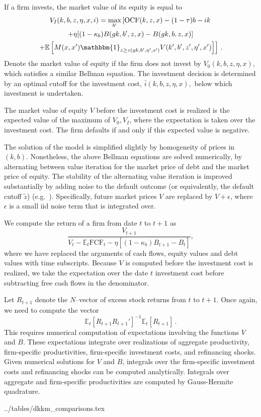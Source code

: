 \documentclass[12pt]{scrarticle}
\begin{document}
\begin{appendices}
If a firm invests, the market value of its equity is equal to 
\begin{multline*}
V_I(k, b, z, \eta, x, i) = \max_{b'}\left[\text{OCF}(k, z, x) - (1 - \tau) b - ik\right.\\
\left.+ \eta[(1 - \kappa_b) B(gk, b', z, x) - B(gk, b, z, x)] \right.\\
\left.+  \mathbb{E}\left[ M(x, x') \mathbbm{1}_{z \geq z(gk, b', \eta', s')} V(k', b', z', \eta', x')\right]\right]\, .
\end{multline*}
Denote the market value of equity if the firm does not invest by $V_0(k, b, z, \eta, x),$ which satisfies a similar Bellman equation. The investment decision is determined by an optimal cutoff for the investment cost, $\bar i(k, b, z, \eta, x),$ below which investment is undertaken. 

The market value of equity $V$ before the investment cost is realized is the expected value of the maximum of $V_0, V_I$, where the expectation is taken over the investment cost. The firm defaults if and only if this expected value is negative. 

The solution of the model is simplified slightly by homogeneity of prices in $(k, b).$ Nonetheless, the above Bellman equations are solved numerically, by alternating between value iteration for the market price of debt and the market price of equity. The stability of the alternating value iteration is improved substantially by adding noise to the default outcome (or equivalently, the default cutoff $\tilde z$) (e.g.\ \cite{Chatterjee2012, GS21}). Specifically, future market prices $V$ are replaced by $V + \epsilon$, where $\epsilon$ is a small iid noise term that is integrated over. 

We compute the return of a firm from date $t$ to $t+1$ as 
\begin{equation*}
 \frac{V_{t+1} }{ V_{t} - \mathbb{E}_t\text{FCF}_t -\eta[(1 - \kappa_b) B_{t+1} - B_t]},
\end{equation*}
where we have replaced the arguments of cash flows, equity values and debt values with time subscripts. Because $V$ is computed before the investment cost is realized, we take the expectation over the date $t$ investment cost before subtracting free cash flows in the denominator.

Let $R_{t+1}$ denote the $N$--vector of excess stock returns from $t$ to $t+1$. Once again, we need to compute the vector
$$\mathbb{E}_t[R_{t+1}R_{t+1}']^{-1}\mathbb{E}_t[R_{t+1}]\,.$$ This requires numerical computation of expectations involving the functions $V$ and $B$. These expectations integrate over realizations of aggregate productivity, firm-specific productivities, firm-specific investment costs, and refinancing shocks. Given numerical solutions for $V$ and $B$, integrals over the firm-specific investment costs and refinancing shocks can be computed analytically. Integrals over aggregate and firm-specific productivities are computed by Gauss-Hermite quadrature.

\end{appendices}
\clearpage

\clearpage


 \clearpage
 {../tables/dkkm_comparisons.tex}
\clearpage

\clearpage

\end{document}
